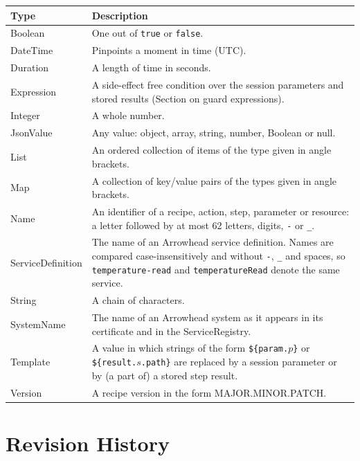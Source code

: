 \documentclass[a4paper]{arrowhead}
\newcommand{\pdef}[1]{{\textcolor{ArrowheadGrey}{#1\label{sec:model:primitives:#1}\label{sec:model:primitives:#1s}\label{sec:model:primitives:#1es}}}}
\begin{document}
{\small
\begin{longtable}{|p{3.2cm}|p{12.6cm}|}

\hline
\rowcolor{gray!33} Type & Description \\ \hline
\endhead
\pdef{Boolean} & One out of \texttt{true} or \texttt{false}. \\ \hline
\pdef{DateTime} & Pinpoints a moment in time (UTC). \\ \hline
\pdef{Duration} & A length of time in seconds. \\ \hline
\pdef{Expression} & A side-effect free condition over the session parameters and stored results (Section on guard expressions). \\ \hline
\pdef{Integer} & A whole number. \\ \hline
\pdef{JsonValue} & Any value: object, array, string, number, Boolean or null. \\ \hline
\pdef{List} & An ordered collection of items of the type given in angle brackets. \\ \hline
\pdef{Map} & A collection of key/value pairs of the types given in angle brackets. \\ \hline
\pdef{Name} & An identifier of a recipe, action, step, parameter or resource: a letter followed by at most 62 letters, digits, \texttt{-} or \texttt{\_}. \\ \hline
\pdef{ServiceDefinition} & The name of an Arrowhead service definition. Names are compared case-insensitively and without \texttt{-}, \texttt{\_} and spaces, so \texttt{temperature-\allowbreak{}read} and \texttt{temperature\allowbreak{}Read} denote the same service. \\ \hline
\pdef{String} & A chain of characters. \\ \hline
\pdef{SystemName} & The name of an Arrowhead system as it appears in its certificate and in the ServiceRegistry. \\ \hline
\pdef{Template} & A value in which strings of the form \texttt{\$\{param.$p$\}} or \texttt{\$\{result.$s$.path\}} are replaced by a session parameter or by (a part of) a stored step result. \\ \hline
\pdef{Version} & A recipe version in the form MAJOR.MINOR.PATCH. \\ \hline
\end{longtable}
}


\newpage



\newpage

\section{Revision History}
\end{document}
